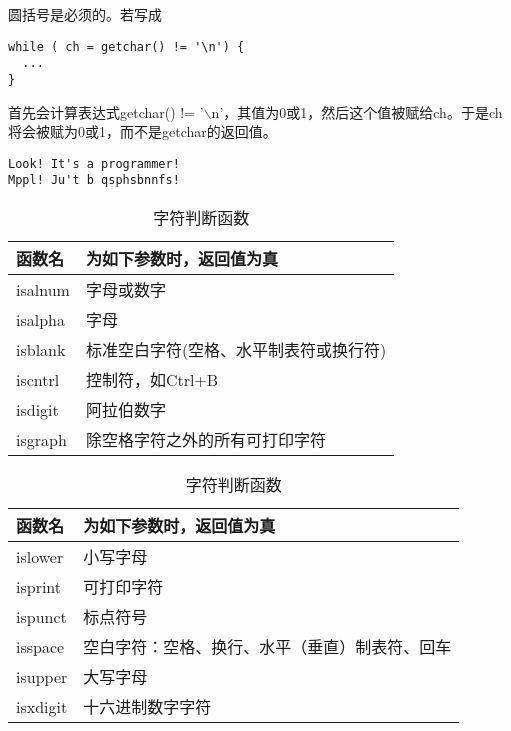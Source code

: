 \begin{frame}[fragile]
\tf 圆括号是必须的。若写成
\begin{lstlisting}
while ( ch = getchar() != '\n') {
  ...   
}
\end{lstlisting}
首先会计算表达式getchar() != '$\backslash$n'，其值为0或1，然后这个值被赋给ch。于是ch将会被赋为0或1，而不是getchar的返回值。
\end{frame}

\begin{frame}[fragile]

\end{frame}

\begin{frame}[fragile]
\begin{lstlisting}[backgroundcolor=\color{red!10}]
Look! It's a programmer!
Mppl! Ju't b qsphsbnnfs!
\end{lstlisting}
\end{frame}

\begin{frame}[fragile]
\begin{table}
\centering
\caption{字符判断函数}
\begin{tabular}{p{2cm}|p{8cm}}\hline
函数名&为如下参数时，返回值为真\\\hline\hline
isalnum & 字母或数字\\[0.1in] 
isalpha & 字母 \\[0.1in] 
isblank & 标准空白字符(空格、水平制表符或换行符) \\[0.1in] 
iscntrl & 控制符，如Ctrl+B \\[0.1in] 
isdigit & 阿拉伯数字 \\[0.1in]
isgraph & 除空格字符之外的所有可打印字符 \\\hline
\end{tabular}
\end{table}
\end{frame}

\begin{frame}[fragile]
\begin{table}
\centering
\caption{字符判断函数}
\begin{tabular}{p{2cm}|p{8cm}}\hline
函数名&为如下参数时，返回值为真\\\hline\hline
islower & 小写字母\\[0.1in]
isprint & 可打印字符 \\[0.1in]
ispunct & 标点符号 \\[0.1in] 
isspace & 空白字符：空格、换行、水平（垂直）制表符、回车 \\[0.1in] 
isupper & 大写字母 \\[0.1in] 
isxdigit & 十六进制数字字符 \\\hline
\end{tabular}
\end{table}
\end{frame}

